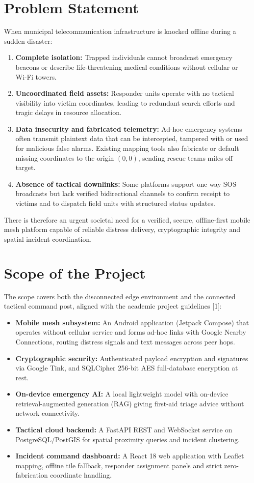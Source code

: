 \documentclass[12pt,a4paper]{report}
\begin{document}
\section{Problem Statement}
When municipal telecommunication infrastructure is knocked offline during a sudden disaster:
\begin{enumerate}
    \item \textbf{Complete isolation:} Trapped individuals cannot broadcast emergency beacons or describe life-threatening medical conditions without cellular or Wi-Fi towers.
    \item \textbf{Uncoordinated field assets:} Responder units operate with no tactical visibility into victim coordinates, leading to redundant search efforts and tragic delays in resource allocation.
    \item \textbf{Data insecurity and fabricated telemetry:} Ad-hoc emergency systems often transmit plaintext data that can be intercepted, tampered with or used for malicious false alarms. Existing mapping tools also fabricate or default missing coordinates to the origin $(0,0)$, sending rescue teams miles off target.
    \item \textbf{Absence of tactical downlinks:} Some platforms support one-way SOS broadcasts but lack verified bidirectional channels to confirm receipt to victims and to dispatch field units with structured status updates.
\end{enumerate}
There is therefore an urgent societal need for a verified, secure, offline-first mobile mesh platform capable of reliable distress delivery, cryptographic integrity and spatial incident coordination.

\section{Scope of the Project}
The scope covers both the disconnected edge environment and the connected tactical command post, aligned with the academic project guidelines [1]:
\begin{itemize}
    \item \textbf{Mobile mesh subsystem:} An Android application (Jetpack Compose) that operates without cellular service and forms ad-hoc links with Google Nearby Connections, routing distress signals and text messages across peer hops.
    \item \textbf{Cryptographic security:} Authenticated payload encryption and signatures via Google Tink, and SQLCipher 256-bit AES full-database encryption at rest.
    \item \textbf{On-device emergency AI:} A local lightweight model with on-device retrieval-augmented generation (RAG) giving first-aid triage advice without network connectivity.
    \item \textbf{Tactical cloud backend:} A FastAPI REST and WebSocket service on PostgreSQL/PostGIS for spatial proximity queries and incident clustering.
    \item \textbf{Incident command dashboard:} A React 18 web application with Leaflet mapping, offline tile fallback, responder assignment panels and strict zero-fabrication coordinate handling.
\end{itemize}
\end{document}
